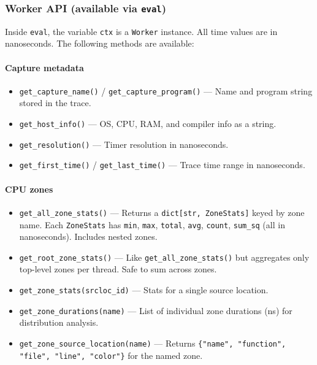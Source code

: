 \documentclass[hidelinks,titlepage,a4paper,twoside]{article}
\begin{document}
\subsubsection{Worker API (available via \texttt{eval})}

Inside \texttt{eval}, the variable \texttt{ctx} is a \texttt{Worker} instance. All time values are in nanoseconds. The following methods are available:

\paragraph{Capture metadata}
\begin{itemize}
\item \texttt{get\_capture\_name()} / \texttt{get\_capture\_program()} --- Name and program string stored in the trace.
\item \texttt{get\_host\_info()} --- OS, CPU, RAM, and compiler info as a string.
\item \texttt{get\_resolution()} --- Timer resolution in nanoseconds.
\item \texttt{get\_first\_time()} / \texttt{get\_last\_time()} --- Trace time range in nanoseconds.
\end{itemize}

\paragraph{CPU zones}
\begin{itemize}
\item \texttt{get\_all\_zone\_stats()} --- Returns a \texttt{dict[str, ZoneStats]} keyed by zone name. Each \texttt{ZoneStats} has \texttt{min}, \texttt{max}, \texttt{total}, \texttt{avg}, \texttt{count}, \texttt{sum\_sq} (all in nanoseconds). Includes nested zones.
\item \texttt{get\_root\_zone\_stats()} --- Like \texttt{get\_all\_zone\_stats()} but aggregates only top-level zones per thread. Safe to sum across zones.
\item \texttt{get\_zone\_stats(srcloc\_id)} --- Stats for a single source location.
\item \texttt{get\_zone\_durations(name)} --- List of individual zone durations (ns) for distribution analysis.
\item \texttt{get\_zone\_source\_location(name)} --- Returns \texttt{\{"name", "function", "file", "line", "color"\}} for the named zone.
\end{itemize}
\end{document}
